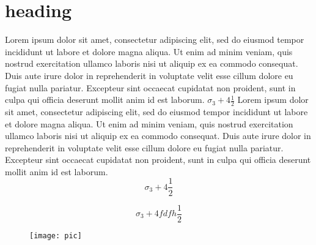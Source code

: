 \documentclass[10pt, a4paper]{article}
\begin{document}
\section{heading}
\label{src:heading}

Lorem ipsum dolor sit amet, consectetur adipiscing elit, sed do eiusmod tempor incididunt ut labore et dolore magna aliqua. Ut enim ad minim veniam, quis nostrud exercitation ullamco laboris nisi ut aliquip ex ea commodo consequat. Duis aute irure dolor in reprehenderit in voluptate velit esse cillum dolore eu fugiat nulla pariatur. Excepteur sint occaecat cupidatat non proident, sunt in culpa qui officia deserunt mollit anim id est laborum. $ \sigma_3 + 4 \frac{1}{2} $ Lorem ipsum dolor sit amet, consectetur adipiscing elit, sed do eiusmod tempor incididunt ut labore et dolore magna aliqua. Ut enim ad minim veniam, quis nostrud exercitation ullamco laboris nisi ut aliquip ex ea commodo consequat. Duis aute irure dolor in reprehenderit in voluptate velit esse cillum dolore eu fugiat nulla pariatur. Excepteur sint occaecat cupidatat non proident, sunt in culpa qui officia deserunt mollit anim id est laborum.
$$ \sigma_3 + 4 \frac{1}{2} $$


\begin{equation}
    \sigma_3 + 4f dfh \frac{1}{2}
\end{equation}

\begin{figure}[h!]
	\texttt{[image: pic]}
\end{figure}


\end{document}
